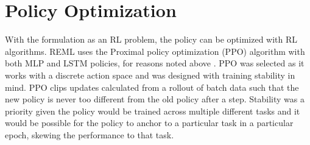 \section{Policy Optimization}
With the formulation as an RL problem, the policy can be optimized with RL algorithms. 
REML uses the Proximal policy optimization (PPO) algorithm with both MLP and LSTM 
policies, for reasons noted above \cite{SchuWolDha:17}. 
PPO was selected as it works with a discrete action space and was designed with 
training stability in mind. PPO clips updates calculated from a rollout of batch
data such that the new policy is never too different from the old policy after a step. 
Stability was a priority given the policy would be trained across multiple different 
tasks and it would be possible for the policy to anchor to a particular task in a 
particular epoch, skewing the performance to that task. 

